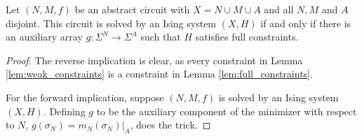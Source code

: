 \documentclass{article}
\begin{document}
\begin{lem}\label{lem:full_constraints}
  Let $(N, M, f)$ be an abstract circuit with $X = N \cup M \cup A$ and all $N, M$ and $A$ disjoint. This circuit is solved by an Ising system $(X, H)$ if and only if there is an auxiliary array $g:\Sigma^N \to \Sigma^A$ such that $H$ satisfies full constraints.
\end{lem}
\begin{proof}
  The reverse implication is clear, as every constraint in Lemma \ref{lem:weak_constraints} is a constraint in Lemma \ref{lem:full_constraints}. 

  For the forward implication, suppose $(N,M,f)$ is solved by an Ising system $(X,H)$. Defining $g$ to be the auxiliary component of the minimizer with respect to $N$, $g(\sigma_N) = m_N(\sigma_N)|_{A}$, does the trick.
\end{proof}
\end{document}
